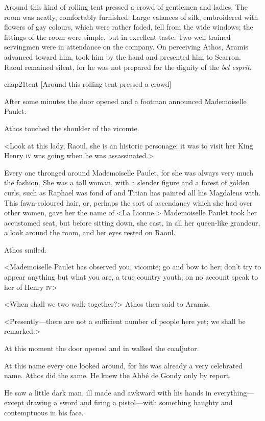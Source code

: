 Around this kind of rolling tent pressed a crowd of gentlemen and ladies. The room was neatly, comfortably furnished. Large valances of silk, embroidered with flowers of gay colours, which were rather faded, fell from the wide windows; the fittings of the room were simple, but in excellent taste. Two well trained servingmen were in attendance on the company. On perceiving Athos, Aramis advanced toward him, took him by the hand and presented him to Scarron. Raoul remained silent, for he was not prepared for the dignity of the \textit{bel esprit}.

\begin{bwbigpic}
	[\basicscale] 
	{chap21tent}
	[Around this rolling tent pressed a crowd]
\end{bwbigpic}

After some minutes the door opened and a footman announced Mademoiselle Paulet.

Athos touched the shoulder of the vicomte.

<Look at this lady, Raoul, she is an historic personage; it was to visit her King Henry \textsc{iv} was going when he was assassinated.>

Every one thronged around Mademoiselle Paulet, for she was always very much the fashion. She was a tall woman, with a slender figure and a forest of golden curls, such as Raphael was fond of and Titian has painted all his Magdalens with. This fawn-coloured hair, or, perhaps the sort of ascendancy which she had over other women, gave her the name of <La Lionne.> Mademoiselle Paulet took her accustomed seat, but before sitting down, she cast, in all her queen-like grandeur, a look around the room, and her eyes rested on Raoul.

Athos smiled.

<Mademoiselle Paulet has observed you, vicomte; go and bow to her; don't try to appear anything but what you are, a true country youth; on no account speak to her of Henry \textsc{iv}>

<When shall we two walk together?> Athos then said to Aramis.

<Presently—there are not a sufficient number of people here yet; we shall be remarked.>

At this moment the door opened and in walked the coadjutor.

At this name every one looked around, for his was already a very celebrated name. Athos did the same. He knew the Abbé de Gondy only by report.

He saw a little dark man, ill made and awkward with his hands in everything—except drawing a sword and firing a pistol—with something haughty and contemptuous in his face.

